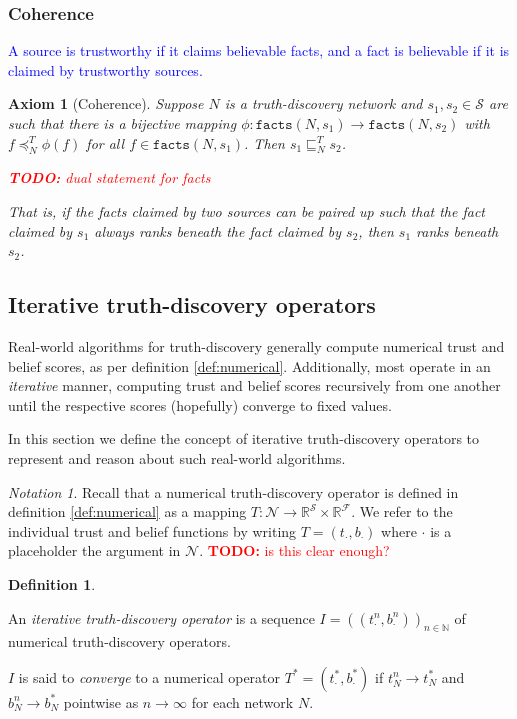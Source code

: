 \documentclass{article}
\theoremstyle{definition} \newtheorem{definition}{Definition}
\theoremstyle{definition} \newtheorem{example}{Example}
\theoremstyle{plain} \newtheorem{axiom}{Axiom}
\theoremstyle{plain} \newtheorem*{remark}{Remark}
\theoremstyle{remark} \newtheorem*{notation}{Notation}
\theoremstyle{plain} \newtheorem{lemma}{Lemma}
\theoremstyle{plain} \newtheorem{theorem}{Theorem}
\theoremstyle{plain} \newtheorem{proposition}{Proposition}
\newcommand{\todo}[1] {
    \textcolor{red}{
        \textbf{TODO:} #1
    }
}
\newcommand{\rough}[1] {
    \textcolor{blue}{
        #1
    }
}
\renewcommand{\S}{\mathcal{S}}  %
\newcommand{\F}{\mathcal{F}}
\newcommand{\N}{\mathcal{N}}
\newcommand{\R}{\mathbb{R}}
\newcommand{\Nat}{\mathbb{N}}
\newcommand{\sle}{\sqsubseteq}
\newcommand{\fle}{\preceq}
\newcommand{\fact}{\texttt{facts}}
\newcommand{\pl}{\cdot}  %
\begin{document}
\subsubsection{Coherence}

\rough{
    A source is trustworthy if it claims believable facts, and a fact is
    believable if it is claimed by trustworthy sources.
}

\begin{axiom}[Coherence]
Suppose $N$ is a truth-discovery network and $s_1, s_2 \in \S$ are such that
there is a bijective mapping $\phi: \fact(N, s_1) \rightarrow \fact(N, s_2)$
with $f \fle_N^T \phi(f)$ for all $f \in \fact(N, s_1)$. Then $s_1 \sle_N^T
s_2$.

\todo{dual statement for facts}

That is, if the facts claimed by two sources can be paired up such that the
fact claimed by $s_1$ always ranks beneath the fact claimed by $s_2$, then
$s_1$ ranks beneath $s_2$.
\end{axiom}

\subsection{Iterative truth-discovery operators}

Real-world algorithms for truth-discovery generally compute numerical trust and
belief scores, as per definition \ref{def:numerical}. Additionally, most
operate in an \emph{iterative} manner, computing trust and belief scores
recursively from one another until the respective scores (hopefully) converge
to fixed values.

In this section we define the concept of iterative truth-discovery operators to
represent and reason about such real-world algorithms.

\begin{notation}
Recall that a numerical truth-discovery operator is defined in definition
\ref{def:numerical} as a mapping $T: \N \rightarrow \R^\S \times \R^\F$. We
refer to the individual trust and belief functions by writing $T=(t_\pl,
b_\pl)$ where $\pl$ is a placeholder the argument in $\N$. \todo{is this
clear enough?}
\end{notation}

\begin{definition}
\label{def:iterative_operator}

An \emph{iterative truth-discovery operator} is a sequence $I=((t_\pl^n,
b_\pl^n))_{n \in \Nat}$ of numerical truth-discovery operators.

$I$ is said to \emph{converge} to a numerical operator $T^*=(t_\pl^*, b_\pl^*)$
if $t_N^n \rightarrow t_N^*$ and $b_N^n \rightarrow b_N^*$ pointwise as $n
\rightarrow \infty$ for each network $N$.

\end{definition}
\end{document}

